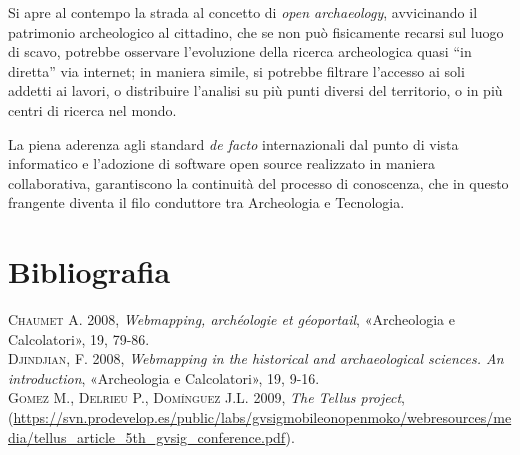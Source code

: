 \documentclass{paper}
\begin{document}
	Si apre al contempo la strada al concetto di \emph{open archaeology},
	avvicinando il patrimonio archeologico al cittadino, che se non pu\`{o}
	fisicamente recarsi sul luogo di scavo, potrebbe osservare l'evoluzione
	della ricerca archeologica quasi ``in diretta'' via internet;
	in maniera simile, si potrebbe filtrare l'accesso ai soli addetti
	ai lavori, o distribuire l'analisi su più punti diversi del territorio,
	o in più centri di ricerca nel mondo.

	La piena aderenza agli standard \emph{de facto} internazionali dal
	punto di vista informatico e l'adozione di software open source realizzato
	in maniera collaborativa, garantiscono la continuit\`{a} del processo
	di conoscenza, che in questo frangente diventa il filo conduttore
	tra Archeologia e Tecnologia.

\section*{Bibliografia}
\textsc{Chaumet A.} 2008, \emph{ Webmapping, arch{\'{e}}ologie et g{\'{e}}oportail}, «Archeologia e Calcolatori», 19, 79-86.\\

\noindent \textsc{Djindjian, F.} 2008, \emph{Webmapping in the historical and archaeological sciences. An introduction}, «Archeologia e Calcolatori», 19, 9-16.\\

\noindent \textsc{Gomez M., Delrieu P., Dom\'{i}nguez J.L.} 2009, \emph{The Tellus project}, (\url{https://svn.prodevelop.es/public/labs/gvsigmobileonopenmoko/webresources/media/tellus_article_5th_gvsig_conference.pdf}).

\pagebreak
\end{document}
